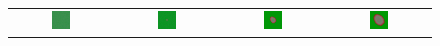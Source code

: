 \begin{figure}[h]
\centering
\mySfFamily
\begin{tabular}{c c c c}
\includegraphics[width = 0.2\textwidth]{../images/predator_prey_11_by_11_f_1_k_1.png} & \includegraphics[width = 0.2\textwidth]{../images/../images/predator_prey_11_by_11_f_1_k_1_i1.png} & \includegraphics[width = 0.2\textwidth]{../images/../images/predator_prey_11_by_11_f_1_k_1_i2.png} & \includegraphics[width = 0.2\textwidth]{../images/../images/predator_prey_11_by_11_f_1_k_1_i3.png}\\[2ex]

\end{tabular}
\end{figure}
